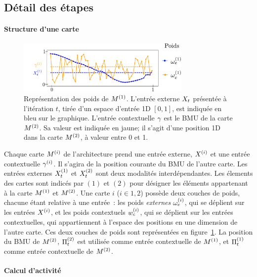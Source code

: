 \documentclass[../main]{subfiles}
\begin{document}
\subsection{Détail des étapes}

\paragraph{Structure d'une carte}
\begin{figure}
    \centering
    \includegraphics[width=0.75\textwidth]{weights_2som.pdf}
    \caption{Représentation des poids de $M^{({1})}$. L'entrée externe $X_t$ présentée à l'itération $t$, tirée d'un espace d'entrée 1D $[0,1]$, est indiquée en bleu sur le graphique. L'entrée contextuelle $\gamma$ est le BMU de la carte $M^{({2})}$. Sa valeur est indiquée en jaune; il s'agit d'une position 1D dans la carte $M^{({2})}$, à valeur entre 0 et 1. \label{fig:2som_weights}}
    \end{figure}
Chaque carte $M^{({i})}$ de l'architecture prend une entrée externe, $X^{({i})}$ et une entrée contextuelle $\gamma^{({i})}$. Il s'agira de la position courante du BMU de l'autre carte.
Les entrées externes $X^{({1})}_t$ et $X^{({2})}_t$ sont deux modalités interdépendantes.
Les élements des cartes sont indicés par $(1)$ et $(2)$ pour désigner les éléments appartenant à la carte $M^{({1})}$ et $M^{({2})}$.
Une carte $i$ ($i \in {1,2}$) possède deux couches de poids, chacune étant relative à une entrée~: les poids \emph{externes} $\omega_e^{({i})}$, qui se déplient sur les entrées $X^{({i})}$, et les poids contextuels $w_c^{({i})}$, qui se déplient sur les entrées contextuelles, qui appartiennent à l'espace des positions en une dimension de l'autre carte. 
Ces deux couches de poids sont représentées en figure~\ref{fig:2som_weights}. La position du BMU de $M^{({2})}$, $\Pi^{({2})}_t$ est utilisée comme entrée contextuelle de $M^{({1})}$, et $\Pi^{({1})}_t$ comme entrée contextuelle de $M^{({2})}$.

\paragraph{Calcul d'activité}
\end{document}
